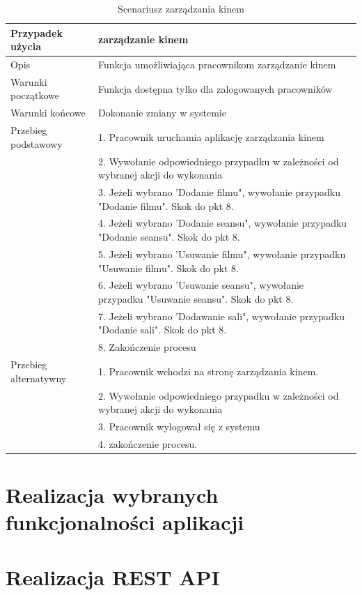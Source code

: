 \begin{table}[H]
	\begin{tabularx}{\textwidth}{ |l|X| }
		\hline 
		Przypadek użycia & zarządzanie kinem  \\ 
		\hline 
		Opis & Funkcja umożliwiająca pracownikom zarządzanie kinem \\ 
		\hline 
		Warunki początkowe & Funkcja dostępna tylko dla zalogowanych pracowników \\ 
		\hline 
		Warunki końcowe & Dokonanie zmiany w systemie  \\ 
		\hline 
		Przebieg podstawowy & 1. Pracownik uruchamia aplikację zarządzania kinem \\ 
		& 2. Wywołanie odpowiedniego przypadku w zależności od wybranej akcji do wykonania \\
		& 3. Jeżeli wybrano 'Dodanie filmu", wywołanie przypadku "Dodanie filmu". Skok do pkt 8. \\
		& 4. Jeżeli wybrano 'Dodanie seansu", wywołanie przypadku "Dodanie seansu". Skok do pkt 8. \\
		& 5. Jeżeli wybrano 'Usuwanie filmu", wywołanie przypadku "Usuwanie filmu". Skok do pkt 8. \\
		& 6. Jeżeli wybrano 'Usuwanie seansu", wywołanie przypadku "Usuwanie seansu". Skok do pkt 8. \\
		& 7. Jeżeli wybrano 'Dodawanie sali", wywołanie przypadku "Dodanie sali". Skok do pkt 8. \\
		& 8. Zakończenie procesu \\
		\hline
		Przebieg alternatywny & 1. Pracownik wchodzi na stronę zarządzania kinem. \\
		& 2. Wywołanie odpowiedniego przypadku w zależności od wybranej akcji do wykonania \\
		& 3. Pracownik wylogował się z systemu \\
		& 4. zakończenie procesu. \\
		\hline 
	\end{tabularx} 
	\caption{Scenariusz zarządzania kinem}
	\label{tab:scen3}   
\end{table}

\section{Realizacja wybranych funkcjonalności aplikacji}
\lssetdef



\section{Realizacja REST API}

